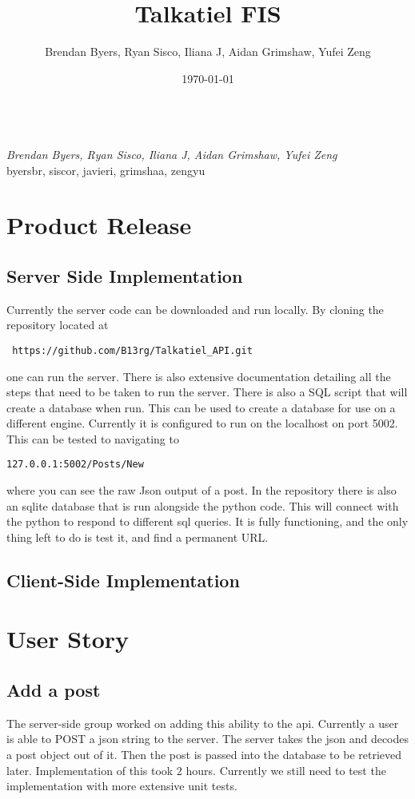 \documentclass[12pt]{article}
\title{Talkatiel FIS}
\author{Brendan Byers, Ryan Sisco, Iliana J, Aidan Grimshaw, Yufei Zeng}
\date{\today}
\begin{document}
\begin{center}
      \Large\textbf{}\\
      \large\textit{Brendan Byers, Ryan Sisco, Iliana J, Aidan Grimshaw, Yufei Zeng}\\
      \large{byersbr, siscor, javieri, grimshaa, zengyu}\\
   \end{center}

\tableofcontents
\section{Product Release}
   \subsection{Server Side Implementation}
   Currently the server code can be downloaded and run locally.  By cloning the repository located at\begin{verbatim} https://github.com/B13rg/Talkatiel_API.git \end{verbatim}one can run the server.  There is also extensive documentation detailing all the steps that need to be taken to run the server.  There is also a SQL script that will create a database when run.  This can be used to create a database for use on a different engine.  Currently it is configured to run on the localhost on port 5002.  This can be tested to navigating to \begin{verbatim}127.0.0.1:5002/Posts/New \end{verbatim}where you can see the raw Json output of a post.  In the repository there is also an sqlite database that is run alongside the python code.  This will connect with the python to respond to different sql queries.  It is fully functioning, and the only thing left to do is test it, and find a permanent URL.

   \subsection{Client-Side Implementation}
\section{User Story}
      \subsection{Add a post}
      The server-side group worked on adding this ability to the api.  Currently a user is able to POST a json string to the server.  The server takes the json and decodes a post object out of it.  Then the post is passed into the database to be retrieved later.  Implementation of this took 2 hours.  Currently we still need to test the implementation with more extensive unit tests.
\end{document}
